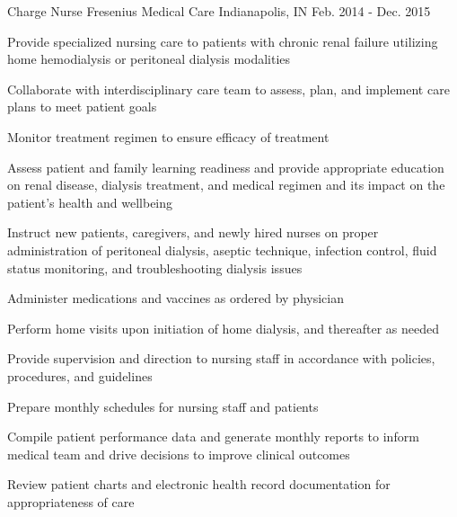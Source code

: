 \begin{cventries}
  \cventry
    {Charge Nurse} %
    {Fresenius Medical Care} %
    {Indianapolis, IN} %
    {Feb. 2014 - Dec. 2015} %
    {
      \begin{cvitems} %
        \item {Provide specialized nursing care to patients with chronic renal failure utilizing home hemodialysis or peritoneal dialysis modalities}
        \item {Collaborate with interdisciplinary care team to assess, plan, and implement care plans to meet patient goals}
        \item {Monitor treatment regimen to ensure efficacy of treatment}
        \item {Assess patient and family learning readiness and provide appropriate education on renal disease, dialysis treatment, and medical regimen and its impact on the patient's health and wellbeing}
        \item {Instruct new patients, caregivers, and newly hired nurses on proper administration of peritoneal dialysis, aseptic technique, infection control, fluid status monitoring, and troubleshooting dialysis issues}
        \item {Administer medications and vaccines as ordered by physician}
        \item {Perform home visits upon initiation of home dialysis, and thereafter as needed}
        \item {Provide supervision and direction to nursing staff in accordance with policies, procedures, and guidelines}
        \item {Prepare monthly schedules for nursing staff and patients}
        \item {Compile patient performance data and generate monthly reports to inform medical team and drive decisions to improve clinical outcomes}
        \item {Review patient charts and electronic health record documentation for appropriateness of care}
      \end{cvitems}
    }


\end{cventries}
